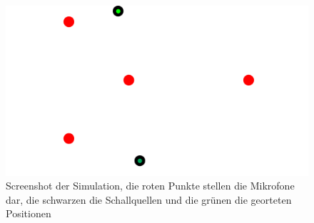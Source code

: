 \begin{figure}[H]
  \centering
  \includegraphics[width=(0.7\linewidth)]{img/bildsimulation}
  \caption{Screenshot der Simulation, die roten Punkte stellen die Mikrofone dar, die schwarzen die Schallquellen und die grünen die georteten Positionen}
\end{figure}

